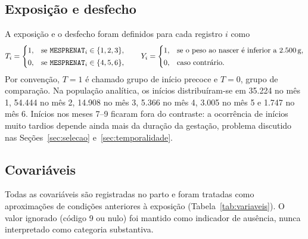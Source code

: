 \documentclass[11pt,a4paper]{article}
\newcommand{\campo}[1]{\texttt{#1}}       %
\begin{document}
\subsection{Exposição e desfecho}

A exposição e o desfecho foram definidos para cada registro $i$ como
\begin{equation}\label{eq:def}
T_i =
\begin{cases}
1, & \text{se } \campo{MESPRENAT}_i \in \{1,2,3\},\\[2pt]
0, & \text{se } \campo{MESPRENAT}_i \in \{4,5,6\},
\end{cases}
\qquad
Y_i =
\begin{cases}
1, & \text{se o peso ao nascer é inferior a 2.500\,g},\\[2pt]
0, & \text{caso contrário.}
\end{cases}
\end{equation}
Por convenção, $T=1$ é chamado grupo de início precoce e $T=0$, grupo de comparação. Na
população analítica, os inícios distribuíram-se em 35.224 no mês 1, 54.444 no mês 2,
14.908 no mês 3, 5.366 no mês 4, 3.005 no mês 5 e 1.747 no mês 6. Inícios nos meses 7--9
ficaram fora do contraste: a ocorrência de inícios muito tardios depende ainda mais da
duração da gestação, problema discutido nas Seções~\ref{sec:selecao}
e~\ref{sec:temporalidade}.

\subsection{Covariáveis}\label{sec:covariaveis}

Todas as covariáveis são registradas no parto e foram tratadas como aproximações de
condições anteriores à exposição (Tabela~\ref{tab:variaveis}). O valor ignorado (código 9
ou nulo) foi mantido como indicador de ausência, nunca interpretado como categoria
substantiva.
\end{document}
